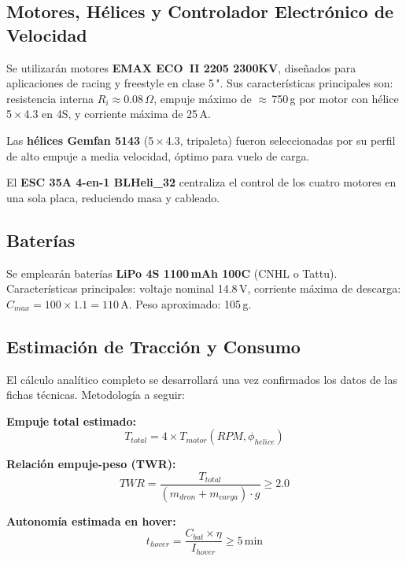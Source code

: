 \documentclass[10pt, twocolumn, letterpaper]{article}
\begin{document}
\subsection{Motores, Hélices y Controlador Electrónico de Velocidad}
Se utilizarán motores \textbf{EMAX ECO~II 2205 2300KV}, diseñados para
aplicaciones de racing y freestyle en clase 5\,". Sus características principales
son: resistencia interna $R_i \approx 0.08\,\Omega$, empuje máximo de
$\approx$\,750\,g por motor con hélice 5\,×\,4.3 en 4S, y corriente máxima
de 25\,A.

Las \textbf{hélices Gemfan 5143} (5\,×\,4.3, tripaleta) fueron seleccionadas
por su perfil de alto empuje a media velocidad, óptimo para vuelo de carga.

El \textbf{ESC 35A 4-en-1 BLHeli\_32} centraliza el control de los cuatro
motores en una sola placa, reduciendo masa y cableado.

\subsection{Baterías}
Se emplearán baterías \textbf{LiPo 4S 1100\,mAh 100C} (CNHL o Tattu).
Características principales: voltaje nominal 14.8\,V, corriente máxima de descarga: $C_{max} = 100 \times 1.1 = 110$\,A. Peso aproximado: 105\,g.

\subsection{Estimación de Tracción y Consumo}
El cálculo analítico completo se desarrollará una vez confirmados los datos de las fichas técnicas. Metodología a seguir:

\textbf{Empuje total estimado:}
\begin{equation}
T_{total} = 4 \times T_{motor}(RPM, \phi_{helice})
\end{equation}

\textbf{Relación empuje-peso (TWR):}
\begin{equation}
TWR = \frac{T_{total}}{(m_{dron} + m_{carga}) \cdot g} \geq 2.0
\end{equation}

\textbf{Autonomía estimada en hover:}
\begin{equation}
t_{hover} = \frac{C_{bat} \times \eta}{I_{hover}} \geq 5\,\text{min}
\end{equation}

\noindent{}
\end{document}
